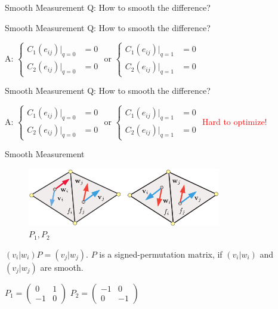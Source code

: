 \documentclass{beamer}
\begin{document}
\begin{frame}{Smooth Measurement}
Q: How to smooth the difference?\smallskip

\end{frame}

\begin{frame}{Smooth Measurement}
Q: How to smooth the difference?\smallskip

A: $\left\{\begin{array}{cc}
C_1(e_{ij})|_{q=0}&=0\\
C_2(e_{ij})|_{q=0}&=0
\end{array}
\right.$ 
or 
$\left\{\begin{array}{cc}
C_1(e_{ij})|_{q=1}&=0\\
C_2(e_{ij})|_{q=1}&=0
\end{array}
\right.$
\end{frame}

\begin{frame}{Smooth Measurement}
Q: How to smooth the difference?\smallskip

A: $\left\{\begin{array}{cc}
C_1(e_{ij})|_{q=0}&=0\\
C_2(e_{ij})|_{q=0}&=0
\end{array}
\right.$ 
or 
$\left\{\begin{array}{cc}
C_1(e_{ij})|_{q=1}&=0\\
C_2(e_{ij})|_{q=1}&=0
\end{array}
\right.$ 
\textcolor{red}{Hard to optimize!}
\end{frame}

\begin{frame}{Smooth Measurement}
\begin{figure}[!htb]
\includegraphics[height=1.0in]{./img/P.png}
\caption{$P_1,P_2$}
\end{figure}
$(v_i|w_i)P=(v_j|w_j)$. $P$ is a signed-permutation matrix, if $(v_i|w_i)$ and $(v_j|w_j)$ are smooth.

$P_1=\left(\begin{array}{cc}
0 & 1\\
-1 & 0
 \end{array}  \right)$ $P_2=\left(\begin{array}{cc}
-1 & 0\\
0 & -1
 \end{array}  \right)$
\end{frame}
\end{document}
